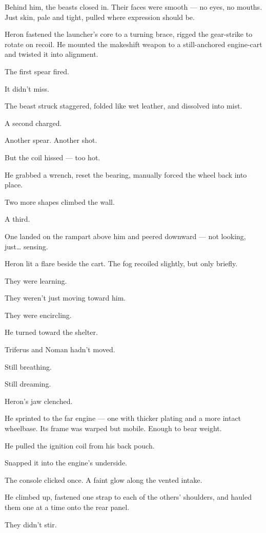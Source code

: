 \documentclass[12pt]{article}
\begin{document}
Behind him, the beasts closed in. Their faces were smooth — no eyes, no mouths. Just skin, pale and tight, pulled where expression should be.

Heron fastened the launcher’s core to a turning brace, rigged the gear-strike to rotate on recoil. He mounted the makeshift weapon to a still-anchored engine-cart and twisted it into alignment.

The first spear fired.

It didn’t miss.

The beast struck staggered, folded like wet leather, and dissolved into mist.

A second charged.

Another spear. Another shot.

But the coil hissed — too hot.

He grabbed a wrench, reset the bearing, manually forced the wheel back into place.

Two more shapes climbed the wall.

A third.

One landed on the rampart above him and peered downward — not looking, just… sensing.

Heron lit a flare beside the cart. The fog recoiled slightly, but only briefly.

They were learning.

They weren’t just moving toward him.

They were encircling.

\bigskip

He turned toward the shelter.

Triferus and Noman hadn’t moved.

Still breathing.

Still dreaming.

Heron’s jaw clenched.

He sprinted to the far engine — one with thicker plating and a more intact wheelbase. Its frame was warped but mobile. Enough to bear weight.

He pulled the ignition coil from his back pouch.

Snapped it into the engine’s underside.

The console clicked once. A faint glow along the vented intake.

He climbed up, fastened one strap to each of the others’ shoulders, and hauled them one at a time onto the rear panel.

They didn’t stir.
\end{document}
